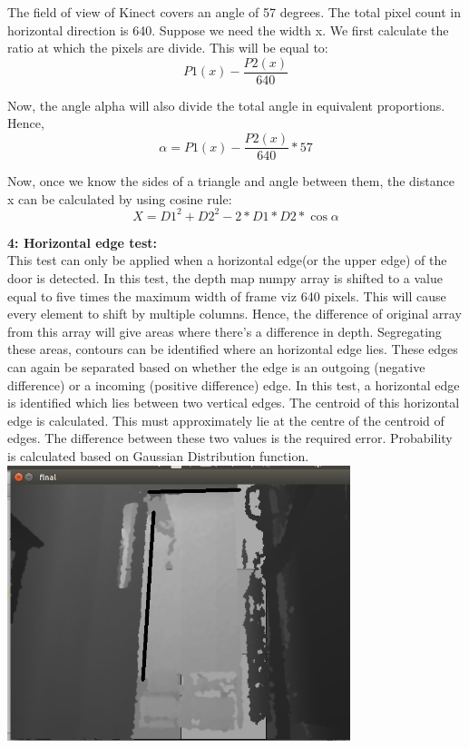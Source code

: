 \documentclass{report}
\begin{document}
The field of view of Kinect covers an angle of 57 degrees. The total pixel count in horizontal direction is 640. 
Suppose we need the width x. We first calculate the ratio at which the pixels are divide. This will be equal to:
\begin{equation}
P1(x) - \frac{P2(x)}{640}
\end{equation}

Now, the angle alpha will also divide the total angle in equivalent proportions. Hence, 
\begin{equation}
\alpha = P1(x) - \frac{P2(x)} {640} * 57
\end{equation}

Now, once we know the sides of a triangle and angle between them, the distance x can be calculated by using cosine rule:
\begin{equation}
X = D1^2 + D2^2 - 2*D1*D2*\cos{\alpha}
\end{equation}
\pagebreak

\textbf{4: Horizontal edge test:} \\

This test can only be applied when a horizontal edge(or the upper edge) of the door is detected. 
In this test, the depth map numpy array is shifted to a value equal to five times the maximum width of 
frame viz 640 pixels. This will cause every element to shift by multiple columns. Hence, the difference of 
original array from this array will give areas where there's a difference in depth. Segregating these areas, 
contours can be identified where an horizontal edge lies. These edges can again be separated based on whether 
the edge is an outgoing (negative difference) or a incoming (positive difference) edge.
In this test, a horizontal edge is identified which lies between two vertical edges. The centroid of this 
horizontal edge is calculated. This must approximately lie at the centre of the centroid of edges. The 
difference between these two values is the required error. Probability is calculated based on Gaussian Distribution function. \\

\includegraphics[width = 10cm]{horizontal.png}
\pagebreak
\end{document}
